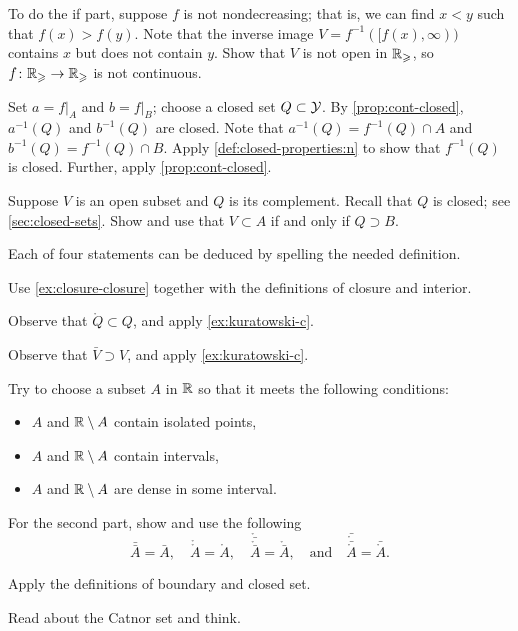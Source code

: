 \begin{multicols}{2}
To do the if part, suppose $f$ is not nondecreasing;
that is, we can find $x<y$ such that $f(x)>f(y)$.
Note that the inverse image $V=f^{-1}([f(x),\infty))$ contains $x$ but does not contain $y$.
Show that $V$ is not open in $\mathbb{R}_\geqslant$, so $f\colon\mathbb{R}_\geqslant\to\mathbb{R}_\geqslant$ is not continuous. 

Set $a=f|_A$ and $b=f|_{B}$; choose a closed set $Q\subset \mathcal{Y}$.
By \ref{prop:cont-closed}, $a^{-1}(Q)$ and $b^{-1}(Q)$ are closed.
Note that $a^{-1}(Q)=f^{-1}(Q)\cap A$ and $b^{-1}(Q)=f^{-1}(Q)\cap B$.
Apply \ref{def:closed-properties:n} to show that $f^{-1}(Q)$ is closed.
Further, apply \ref{prop:cont-closed}.

Suppose $V$ is an open subset and $Q$ is its complement.
Recall that $Q$ is closed; see \ref{sec:closed-sets}.
Show and use that $V\subset A$ if and only if $Q\supset B$.

Each of four statements can be deduced by spelling the needed definition.

 Use \ref{ex:closure-closure} together with the definitions of closure and interior.

Observe that $\mathring Q\subset Q$, and apply \ref{ex:kuratowski-c}.

Observe that $\bar V\supset V$, and apply \ref{ex:kuratowski-c}.

Try to choose a subset $A$ in $\mathbb{R}$ so that it meets the following conditions:
\begin{itemize}
\item $A$ and $\mathbb{R}\setminus A$ contain isolated points,
\item $A$ and $\mathbb{R}\setminus A$ contain intervals,
\item $A$ and $\mathbb{R}\setminus A$ are dense in some interval.
\end{itemize}
For the second part, show and use the following 
\[
\bar{\bar A}=\bar A,
\quad
\mathring{\mathring A}=\mathring A,
\quad
\mathring{\bar{\mathring{\bar A}}}=\mathring{\bar A},
\quad\text{and}\quad 
\bar{\mathring{\bar{\mathring A}}}=\bar{\mathring A}.
\]

Apply the definitions of boundary and closed set.

Read about the Catnor set and think.


\end{multicols}
